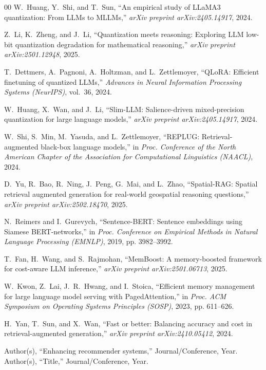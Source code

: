 \documentclass{ieeeaccess}
\begin{document}
\begin{thebibliography}{00}
W.~Huang, Y.~Shi, and T.~Sun, 
``An empirical study of LLaMA3 quantization: From LLMs to MLLMs,'' 
\emph{arXiv preprint arXiv:2405.14917}, 2024.

Z.~Li, K.~Zheng, and J.~Li, 
``Quantization meets reasoning: Exploring LLM low-bit quantization degradation for mathematical reasoning,'' 
\emph{arXiv preprint arXiv:2501.12948}, 2025.

T.~Dettmers, A.~Pagnoni, A.~Holtzman, and L.~Zettlemoyer, 
``QLoRA: Efficient finetuning of quantized LLMs,'' 
\emph{Advances in Neural Information Processing Systems (NeurIPS)}, vol.~36, 2024.

W.~Huang, X.~Wan, and J.~Li, 
``Slim-LLM: Salience-driven mixed-precision quantization for large language models,'' 
\emph{arXiv preprint arXiv:2405.14917}, 2024.

W.~Shi, S.~Min, M.~Yasuda, and L.~Zettlemoyer, 
``REPLUG: Retrieval-augmented black-box language models,'' 
in \emph{Proc. Conference of the North American Chapter of the Association for Computational Linguistics (NAACL)}, 2024.

D.~Yu, R.~Bao, R.~Ning, J.~Peng, G.~Mai, and L.~Zhao, 
``Spatial-RAG: Spatial retrieval augmented generation for real-world geospatial reasoning questions,'' 
\emph{arXiv preprint arXiv:2502.18470}, 2025.

N.~Reimers and I.~Gurevych, 
``Sentence-BERT: Sentence embeddings using Siamese BERT-networks,'' 
in \emph{Proc. Conference on Empirical Methods in Natural Language Processing (EMNLP)}, 2019, pp. 3982--3992.

T.~Fan, H.~Wang, and S.~Rajmohan, 
``MemBoost: A memory-boosted framework for cost-aware LLM inference,'' 
\emph{arXiv preprint arXiv:2501.06713}, 2025.

W.~Kwon, Z.~Lai, J.~R.~Hwang, and I.~Stoica, 
``Efficient memory management for large language model serving with PagedAttention,'' 
in \emph{Proc. ACM Symposium on Operating Systems Principles (SOSP)}, 2023, pp. 611--626.

H.~Yan, T.~Sun, and X.~Wan, 
``Fast or better: Balancing accuracy and cost in retrieval-augmented generation,'' 
\emph{arXiv preprint arXiv:2410.05412}, 2024.

Author(s), ``Enhancing recommender systems,'' Journal/Conference, Year.
Author(s), ``Title,'' Journal/Conference, Year.

\end{thebibliography}
\end{document}
